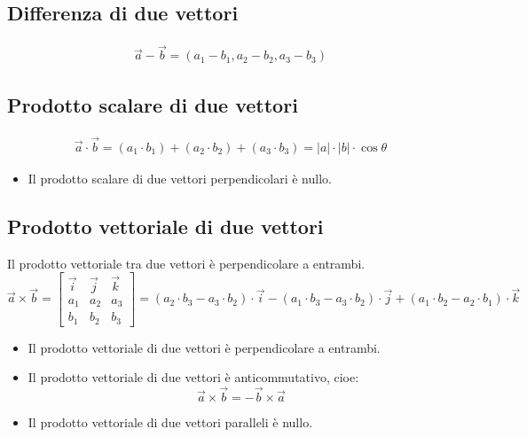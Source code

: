 \subsection{Differenza di due vettori}
	\begin{displaymath}\begin{aligned}
		\vec{a} - \vec{b} = (a_1 - b_1, a_2 - b_2, a_3 - b_3)
	\end{aligned}\end{displaymath}
    
\subsection{Prodotto scalare di due vettori}
	\begin{displaymath}\begin{aligned}
		\vec{a} \cdot \vec{b} = (a_1 \cdot b_1) + (a_2 \cdot b_2) + (a_3 \cdot b_3) = |a| \cdot |b| \cdot \cos{\theta}
	\end{aligned}\end{displaymath}
    \begin{itemize}
    	\item{Il prodotto scalare di due vettori perpendicolari è nullo.}
    \end{itemize}
    
\subsection{Prodotto vettoriale di due vettori}
Il prodotto vettoriale tra due vettori è perpendicolare a entrambi.
	\begin{displaymath}
    	\vec{a} \times \vec{b} = 
        \begin{bmatrix}
    		\vec{i} & \vec{j} & \vec{k}\\
        	a_1 & a_2 & a_3 \\
        	b_1 & b_2 & b_3
    	\end{bmatrix} =
        (a_2 \cdot b_3 - a_3 \cdot b_2) \cdot \vec{i}
        - (a_1 \cdot b_3 - a_3 \cdot b_2) \cdot \vec{j}
        + (a_1 \cdot b_2 - a_2 \cdot b_1) \cdot \vec{k}
    \end{displaymath}
\begin{itemize}
	\item{Il prodotto vettoriale di due vettori è perpendicolare a entrambi.}
    \item{Il prodotto vettoriale di due vettori è anticommutativo, cioe:
    	\begin{displaymath}
        	\vec{a} \times \vec{b} = - \vec{b} \times \vec{a}
        \end{displaymath}}
    \item{Il prodotto vettoriale di due vettori paralleli è nullo. }    
\end{itemize}

